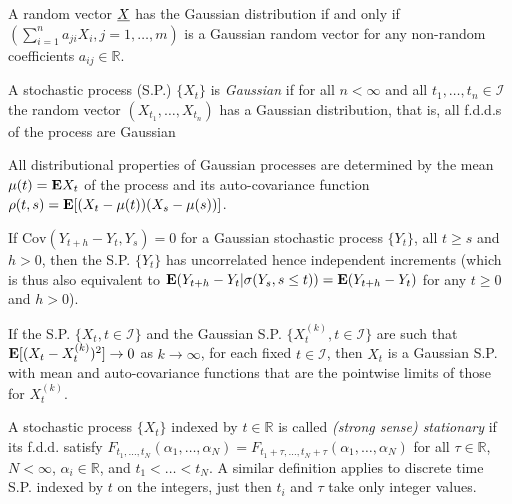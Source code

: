 \begin{proposition*}
A random vector ${\underline{X}}$ has the Gaussian distribution if and only if $(\sum_{i=1}^n a_{ji}X_i, j=1,\dots,m)$ is a Gaussian random vector for any non-random coefficients $a_{ij} \in \mathbb R$.
\end{proposition*}

\begin{definition*}
A stochastic process (S.P.) $\{X_t\}$ is \emph{Gaussian} if for all $n < \infty$ and all $t_1,\dots,t_n \in \mathcal I$ the random vector $(X_{t_1},\dots,X_{t_n})$ has a Gaussian distribution, that is, all f.d.d.s of the process are Gaussian
\end{definition*}

\begin{corollary*}
All distributional properties of Gaussian processes are determined by the mean $\mu(t) = \mathbf{E} X_t$ of the process and its auto-covariance function $\rho(t,s) = \mathbf{E}[(X_t-\mu(t))(X_s-\mu(s))]$.
\end{corollary*}

\begin{proposition*}
If $\text{Cov}(Y_{t+h} - Y_t,Y_s) = 0$ for a Gaussian stochastic process $\{Y_t\}$, all $t\geq s$ and $h>0$, then the S.P. $\{Y_t\}$ has uncorrelated hence independent increments (which is thus also equivalent to $\mathbf{E}(Y_{t+h} - Y_t | \sigma(Y_s, s\leq t)) = \mathbf{E}(Y_{t+h}-Y_t)$ for any $t \geq 0$ and $h > 0$).
\end{proposition*}

\begin{proposition*}
If the S.P. $\{X_t, t\in\mathcal I\}$ and the Gaussian S.P. $\{X_t^{(k)},t\in\mathcal I\}$ are such that $\mathbf{E}[(X_t - X_t^{(k)})^2]\to0$ as $k\to\infty$, for each fixed $t \in \mathcal I$, then $X_t$ is a Gaussian S.P. with mean and auto-covariance functions that are the pointwise limits of those for $X_t^{(k)}$.
\end{proposition*}


\begin{definition*}
A stochastic process $\{X_t\}$ indexed by $t\in\mathbb R$ is called \emph{(strong sense) stationary} if its f.d.d. satisfy
$F_{t_1,\dots,t_N}(\alpha_1,\dots,\alpha_N) = F_{t_1+\tau,\dots,t_N+\tau}(\alpha_1,\dots,\alpha_N)$ for all $\tau\in\mathbb R$, $N<\infty$, $\alpha_i\in\mathbb R$, and $t_1<\dots<t_N$. A similar definition applies to discrete time S.P. indexed by $t$ on the integers, just then $t_i$ and $\tau$ take only integer values.
\end{definition*}

